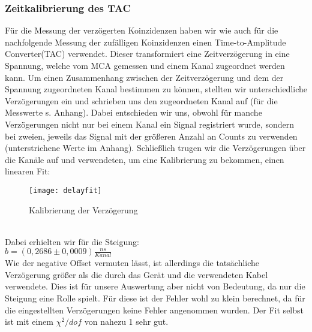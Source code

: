 \subsubsection{Zeitkalibrierung des TAC}
Für die Messung der verzögerten Koinzidenzen haben wir wie auch für die nachfolgende Messung der zufälligen Koinzidenzen einen \glqq Time-to-Amplitude Converter\grqq (TAC) verwendet. Dieser transformiert eine Zeitverzögerung in eine Spannung, welche vom MCA gemessen und einem Kanal zugeordnet werden kann. Um einen Zusammenhang zwischen der Zeitverzögerung und dem der Spannung zugeordneten Kanal bestimmen zu können, stellten wir unterschiedliche Verzögerungen ein und schrieben uns den zugeordneten Kanal auf (für die Messwerte s. Anhang). Dabei entschieden wir uns, obwohl für manche Verzögerungen nicht nur bei einem Kanal ein Signal registriert wurde, sondern bei zweien, jeweils das Signal mit der größeren Anzahl an Counts zu verwenden (unterstrichene Werte im Anhang). Schließlich trugen wir die Verzögerungen über die Kanäle auf und verwendeten, um eine Kalibrierung zu bekommen, einen linearen Fit:\\
\begin{figure}[h]
\texttt{[image: delayfit]}
\caption{Kalibrierung der Verzögerung}
\end{figure}\\
Dabei erhielten wir für die Steigung:\\
$b=(0,2686\pm0,0009)\frac{ns}{Kanal}$\\
Wie der negative Offset vermuten lässt, ist allerdings die tatsächliche Verzögerung größer als die durch das Gerät und die verwendeten Kabel verwendete. Dies ist für unsere Auswertung aber nicht von Bedeutung, da nur die Steigung eine Rolle spielt. Für diese ist der Fehler wohl zu klein berechnet, da für die eingestellten Verzögerungen keine Fehler angenommen wurden. Der Fit selbst ist mit einem $\chi^{2}/dof$ von nahezu 1 sehr gut. \\
